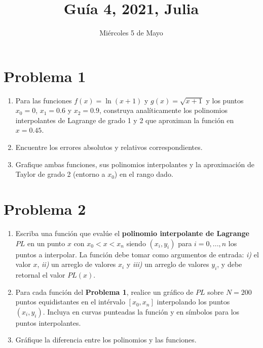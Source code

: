 \documentclass[11pt]{article}
\title{Guía 4, 2021, Julia}
\begin{document}
    
    \date{Miércoles 5 de Mayo}    
    \maketitle
    

    
    \hypertarget{problema-1}{%
\section*{Problema 1}\label{problema-1}}

\begin{enumerate}
\def\labelenumi{\arabic{enumi}.}
\item
  Para las funciones \(f(x) = \ln (x+1)\) y \(g(x) = \sqrt{x+1}\) y los
  puntos \(x_0 = 0\), \(x_1=0.6\) y \(x_2=0.9\), construya
  analíticamente los polinomios interpolantes de Lagrange de grado 1 y 2
  que aproximan la función en \(x=0.45\).
\item
  Encuentre los errores absolutos y relativos correspondientes.
\item
  Grafique ambas funciones, sus polinomios interpolantes y la
  aproximación de Taylor de grado 2 (entorno a \(x_0\)) en el rango
  dado.
\end{enumerate}

    \hypertarget{problema-2}{%
\section*{Problema 2}\label{problema-2}}

\begin{enumerate}
\def\labelenumi{\arabic{enumi}.}
\item
  Escriba una función que evalúe el \textbf{polinomio interpolante de
  Lagrange} \(PL\) en un punto \(x\) con \(x_0 < x < x_n\) siendo
  \((x_i,y_i)\) para \(i=0,...,n\) los puntos a interpolar. La función
  debe tomar como argumentos de entrada: \emph{i)} el valor \(x\),
  \emph{ii)} un arreglo de valores \(x_i\) y \emph{iii)} un arreglo de
  valores \(y_i\), y debe retornal el valor \(PL(x)\).
\item
  Para cada función del \textbf{Problema 1}, realice un gráfico de
  \(PL\) sobre \(N=200\) puntos equidistantes en el intérvalo
  \([x_0,x_n]\) interpolando los puntos \((x_i,y_i)\). Incluya en curvas
  punteadas la función y en símbolos para los puntos interpolantes.
\item
  Gráfique la diferencia entre los polinomios y las funciones.
\end{enumerate}
\end{document}

